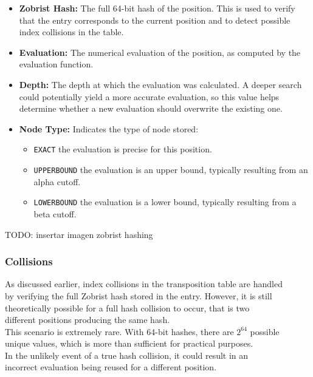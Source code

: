 \begin{itemize}
  \item \textbf{Zobrist Hash:} The full 64-bit hash of the position. This is used to verify that the entry corresponds to the current position and to detect possible index collisions in the table.
  
  \item \textbf{Evaluation:} The numerical evaluation of the position, as computed by the evaluation function.
  
  \item \textbf{Depth:} The depth at which the evaluation was calculated. A deeper search could potentially yield a more accurate evaluation, so this value helps determine whether a new evaluation should overwrite the existing one.
  
  \item \textbf{Node Type:} Indicates the type of node stored:
  \begin{itemize}
    \item \texttt{EXACT} the evaluation is precise for this position.
    \item \texttt{UPPERBOUND} the evaluation is an upper bound, typically resulting from an alpha cutoff.
    \item \texttt{LOWERBOUND} the evaluation is a lower bound, typically resulting from a beta cutoff.
  \end{itemize}
\end{itemize}

TODO: insertar imagen zobrist hashing

\subsubsection{Collisions}

As discussed earlier, index collisions in the transposition table are handled\\
by verifying the full Zobrist hash stored in the entry. However, it is still\\
theoretically possible for a full hash collision to occur, that is two\\
different positions producing the same hash.\\

This scenario is extremely rare. With 64-bit hashes, there are $2^{64}$ possible\\
unique values, which is more than sufficient for practical purposes.\\
In the unlikely event of a true hash collision, it could result in an\\
incorrect evaluation being reused for a different position.\\

